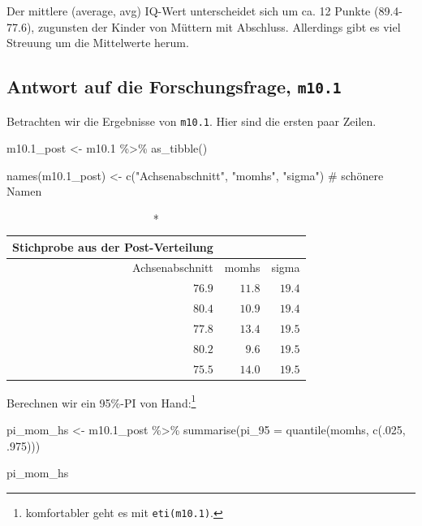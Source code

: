 \documentclass[
  a4paper,
  DIV=11]{scrreprt}
\newenvironment{Shaded}{\begin{snugshade}}{\end{snugshade}}
\newcommand{\AttributeTok}[1]{\textcolor[rgb]{0.40,0.45,0.13}{#1}}
\newcommand{\CommentTok}[1]{\textcolor[rgb]{0.37,0.37,0.37}{#1}}
\newcommand{\DecValTok}[1]{\textcolor[rgb]{0.68,0.00,0.00}{#1}}
\newcommand{\FloatTok}[1]{\textcolor[rgb]{0.68,0.00,0.00}{#1}}
\newcommand{\FunctionTok}[1]{\textcolor[rgb]{0.28,0.35,0.67}{#1}}
\newcommand{\NormalTok}[1]{\textcolor[rgb]{0.00,0.23,0.31}{#1}}
\newcommand{\OtherTok}[1]{\textcolor[rgb]{0.00,0.23,0.31}{#1}}
\newcommand{\SpecialCharTok}[1]{\textcolor[rgb]{0.37,0.37,0.37}{#1}}
\newcommand{\StringTok}[1]{\textcolor[rgb]{0.13,0.47,0.30}{#1}}
\theoremstyle{definition}
\theoremstyle{remark}
\begin{document}
Der mittlere (average, avg) IQ-Wert unterscheidet sich um ca. 12 Punkte
(89.4-77.6), zugunsten der Kinder von Müttern mit Abschluss. Allerdings
gibt es viel Streuung um die Mittelwerte herum.

\hypertarget{antwort-auf-die-forschungsfrage-m10.1}{%
\subsection{\texorpdfstring{Antwort auf die Forschungsfrage,
\texttt{m10.1}}{Antwort auf die Forschungsfrage, m10.1}}\label{antwort-auf-die-forschungsfrage-m10.1}}

Betrachten wir die Ergebnisse von \texttt{m10.1}. Hier sind die ersten
paar Zeilen.

\begin{Shaded}
\begin{Highlighting}[]
\NormalTok{m10}\FloatTok{.1}\NormalTok{\_post }\OtherTok{\textless{}{-}}
\NormalTok{  m10}\FloatTok{.1} \SpecialCharTok{\%\textgreater{}\%} 
  \FunctionTok{as\_tibble}\NormalTok{() }

\FunctionTok{names}\NormalTok{(m10}\FloatTok{.1}\NormalTok{\_post) }\OtherTok{\textless{}{-}} \FunctionTok{c}\NormalTok{(}\StringTok{"Achsenabschnitt"}\NormalTok{, }\StringTok{"momhs"}\NormalTok{, }\StringTok{"sigma"}\NormalTok{)  }\CommentTok{\# schönere Namen}
\end{Highlighting}
\end{Shaded}

\begin{longtable}{rrr}
\caption*{
{\large Stichprobe aus der Post-Verteilung}
} \\ 
\toprule
Achsenabschnitt & momhs & sigma \\ 
\midrule
$76.9$ & $11.8$ & $19.4$ \\ 
$80.4$ & $10.9$ & $19.4$ \\ 
$77.8$ & $13.4$ & $19.5$ \\ 
$80.2$ & $9.6$ & $19.5$ \\ 
$75.5$ & $14.0$ & $19.5$ \\ 
\bottomrule
\end{longtable}

Berechnen wir ein 95\%-PI von Hand:\footnote{komfortabler geht es mit
  \texttt{eti(m10.1)}.}

\begin{Shaded}
\begin{Highlighting}[]
\NormalTok{pi\_mom\_hs }\OtherTok{\textless{}{-}}
\NormalTok{  m10}\FloatTok{.1}\NormalTok{\_post }\SpecialCharTok{\%\textgreater{}\%} 
  \FunctionTok{summarise}\NormalTok{(}\AttributeTok{pi\_95 =} \FunctionTok{quantile}\NormalTok{(momhs, }\FunctionTok{c}\NormalTok{(.}\DecValTok{025}\NormalTok{, .}\DecValTok{975}\NormalTok{)))}

\NormalTok{pi\_mom\_hs}
\end{Highlighting}
\end{Shaded}
\end{document}
